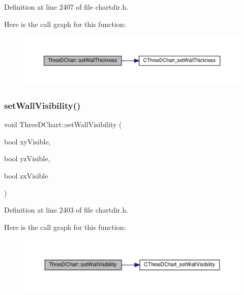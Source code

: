 Definition at line 2407 of file chartdir.\+h.

Here is the call graph for this function\+:
\nopagebreak
\begin{figure}[H]
\begin{center}
\leavevmode
\includegraphics[width=350pt]{class_three_d_chart_a13b070b549798dae6ba2420cc1d398f8_cgraph}
\end{center}
\end{figure}
\mbox{\label{class_three_d_chart_aae30e639c65f6232decc2c34e4e8b518}} 
\subsubsection{\texorpdfstring{set\+Wall\+Visibility()}{setWallVisibility()}}
{\footnotesize\ttfamily void Three\+D\+Chart\+::set\+Wall\+Visibility (\begin{DoxyParamCaption}\item[{bool}]{xy\+Visible,  }\item[{bool}]{yz\+Visible,  }\item[{bool}]{zx\+Visible }\end{DoxyParamCaption})\hspace{0.3cm}{\ttfamily [inline]}}



Definition at line 2403 of file chartdir.\+h.

Here is the call graph for this function\+:
\nopagebreak
\begin{figure}[H]
\begin{center}
\leavevmode
\includegraphics[width=350pt]{class_three_d_chart_aae30e639c65f6232decc2c34e4e8b518_cgraph}
\end{center}
\end{figure}
\mbox{\label{class_three_d_chart_a671db5985c3fa486e6e693153bf4ad18}} 
